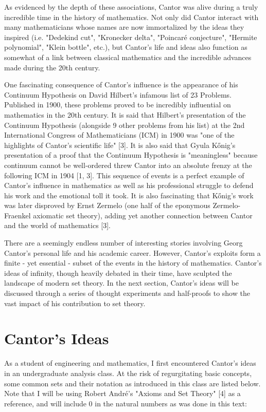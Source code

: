 \documentclass{article}
\begin{document}
As evidenced by the depth of these associations, Cantor was alive during a truly incredible time in the history of mathematics.  Not only did Cantor interact with many mathematicians whose names are now immortalized by the ideas they inspired (i.e. "Dedekind cut", "Kronecker delta", "Poincaré conjecture", "Hermite polynomial", "Klein bottle", etc.), but Cantor's life and ideas also function as somewhat of a link between classical mathematics and the incredible advances made during the 20th century.

One fascinating consequence of Cantor's influence is the appearance of his Continuum Hypothesis on David Hilbert's infamous list of 23 Problems.  Published in 1900, these problems proved to be incredibly influential on mathematics in the 20th century.  It is said that Hilbert's presentation of the Continuum Hypothesis (alongside 9 other problems from his list) at the 2nd International Congress of Mathematicians (ICM) in 1900 was "one of the highlights of Cantor's scientific life" [3].  It is also said that Gyula Kőnig's presentation of a proof that the Continuum Hypothesis is "meaningless" because continuum cannot be well-ordered threw Cantor into an absolute frenzy at the following ICM in 1904 [1, 3].  This sequence of events is a perfect example of Cantor's influence in mathematics as well as his professional struggle to defend his work and the emotional toll it took.  It is also fascinating that Kőnig's work was later disproved by Ernst Zermelo (one half of the eponymous Zermelo-Fraenkel axiomatic set theory), adding yet another connection between Cantor and the world of mathematics [3].

There are a seemingly endless number of interesting stories involving Georg Cantor's personal life and his academic career.  However, Cantor's exploits form a finite - yet essential - subset of the events in the history of mathematics.  Cantor's ideas of infinity, though heavily debated in their time, have sculpted the landscape of modern set theory.  In the next section, Cantor's ideas will be discussed through a series of thought experiments and half-proofs to show the vast impact of his contribution to set theory.

\section{Cantor's Ideas}
As a student of engineering and mathematics, I first encountered Cantor's ideas in an undergraduate analysis class.  At the risk of regurgitating basic concepts, some common sets and their notation as introduced in this class are listed below.  Note that I will be using Robert André's "Axioms and Set Theory" [4] as a reference, and will include 0 in the natural numbers as was done in this text:
\end{document}
